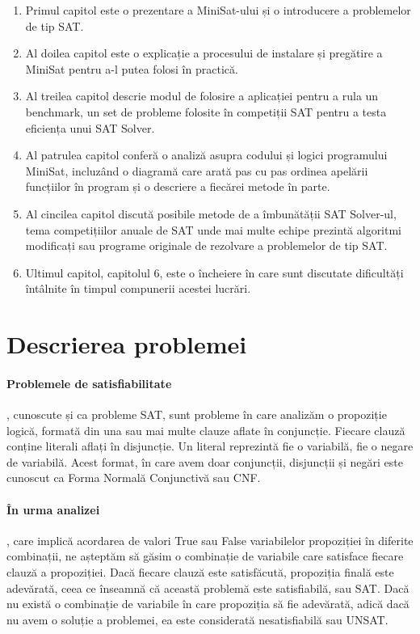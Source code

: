 \documentclass[runningheads]{llncs}
\begin{document}
\begin{enumerate}
    \item Primul capitol este o prezentare a MiniSat-ului  și o introducere a problemelor de tip SAT.
    \item Al doilea capitol este o explicație a procesului de instalare și pregătire a MiniSat pentru a-l putea folosi în practică.
    \item Al treilea capitol descrie modul de folosire a aplicației pentru a rula un benchmark, un set de probleme folosite în competiții SAT pentru a testa eficiența unui SAT Solver.
    \item Al patrulea capitol conferă o analiză asupra codului și logici programului MiniSat, incluzând o diagramă care arată pas cu pas ordinea apelării funcțiilor în program și o descriere a fiecărei metode în parte.
    \item Al cincilea capitol discută posibile metode de a îmbunătății SAT Solver-ul, tema competițiilor anuale de SAT unde mai multe echipe prezintă algoritmi modificați sau programe originale de rezolvare a problemelor de tip SAT.
    \item Ultimul capitol, capitolul 6, este o încheiere în care sunt discutate dificultăți întâlnite în timpul compunerii acestei lucrări.
\end{enumerate}


\section{Descrierea problemei}
\paragraph{Problemele de satisfiabilitate}, cunoscute și ca probleme SAT, sunt probleme în care analizăm o propoziție logică, formată din una sau mai multe clauze aflate în conjuncție. Fiecare clauză conține literali aflați în disjuncție. Un literal reprezintă fie o variabilă, fie o negare de variabilă. Acest format, în care avem doar conjuncții, disjuncții și negări este cunoscut ca Forma Normală Conjunctivă sau CNF. \cite{biere2009handbook}

\paragraph{În urma analizei}, care implică acordarea de valori True sau False variabilelor propoziției în diferite combinații, ne așteptăm să găsim o combinație de variabile care satisface fiecare clauză a propoziției. Dacă fiecare clauză este satisfăcută, propoziția finală este adevărată, ceea ce înseamnă că această problemă este satisfiabilă, sau SAT. Dacă nu există o combinație de variabile în care propoziția să fie adevărată, adică dacă nu avem o soluție a problemei, ea este considerată nesatisfiabilă sau UNSAT. \cite{zhang2013boolean}
\end{document}

